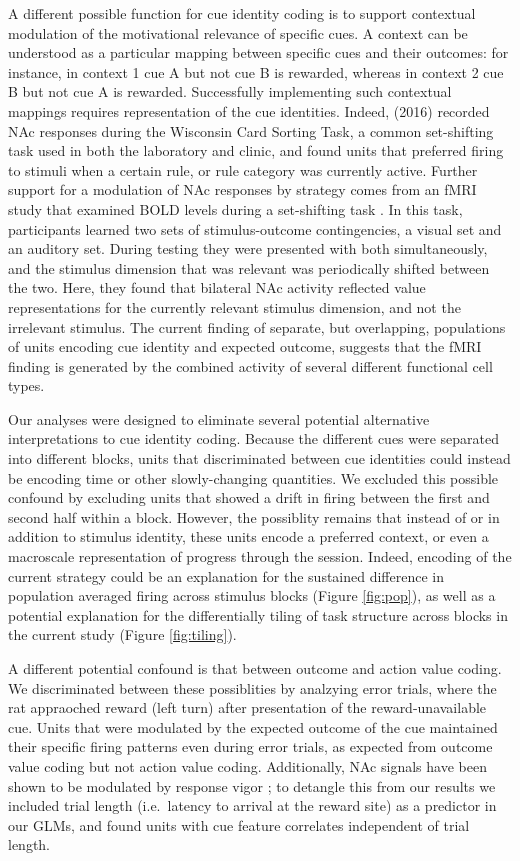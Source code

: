 \documentclass[11pt]{article}
\let\cite=\citep
\begin{document}
A different possible function for cue identity coding is to support
contextual modulation of the motivational relevance of specific
cues. A context can be understood as a particular mapping between
specific cues and their outcomes: for instance, in context 1 cue A but
not cue B is rewarded, whereas in context 2 cue B but not cue A is
rewarded. Successfully implementing such contextual mappings requires
representation of the cue identities. Indeed, \citeauthor{Sleezer2016} (2016)
recorded NAc responses during the Wisconsin Card Sorting Task,
a common set-shifting task used in both the laboratory and clinic, and
found units that preferred firing to stimuli when a certain rule, or
rule category was currently active. Further support for a
modulation of NAc responses by strategy comes from an fMRI study that
examined BOLD levels during a set-shifting task
\cite{Fitzgerald2014}. In this task, participants learned two sets of
stimulus-outcome contingencies, a visual set and an auditory set. During
testing they were presented with both simultaneously, and the stimulus
dimension that was relevant was periodically shifted between the
two. Here, they found that bilateral NAc activity reflected value
representations for the currently relevant stimulus dimension, and not
the irrelevant stimulus. The current finding of separate, but
overlapping, populations of units encoding cue identity and expected
outcome, suggests that the fMRI finding is generated by the combined
activity of several different functional cell types.

Our analyses were designed to eliminate several potential alternative
interpretations to cue identity coding. Because the different cues
were separated into different blocks, units that discriminated between
cue identities could instead be encoding time or other slowly-changing
quantities. We excluded this possible confound by excluding units that
showed a drift in firing between the first and second half within a
block. However, the possiblity remains that instead of or in addition
to stimulus identity, these units encode a preferred context, or even
a macroscale representation of progress through the session. Indeed,
encoding of the current strategy could be an explanation for the
sustained difference in population averaged firing across stimulus
blocks (Figure \ref{fig:pop}), as well as a potential explanation for
the differentially tiling of task structure across blocks in the
current study (Figure \ref{fig:tiling}).

A different potential confound is that between outcome and action
value coding. We discriminated between these possiblities by analzying
error trials, where the rat appraoched reward (left turn) after
presentation of the reward-unavailable cue. Units that were modulated
by the expected outcome of the cue maintained their specific firing
patterns even during error trials, as expected from outcome value
coding but not action value coding. Additionally, NAc signals have
been shown to be modulated by response vigor \cite{McGinty2013}; to
detangle this from our results we included trial length (i.e.\ latency
to arrival at the reward site) as a predictor in our GLMs, and found
units with cue feature correlates independent of trial length.
\end{document}
